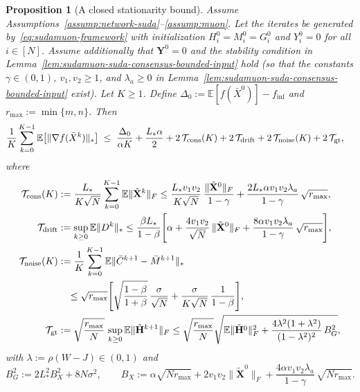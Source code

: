 \documentclass{article}
\newtheorem{proposition}{Proposition}
\begin{document}
\begin{proposition}[A closed stationarity bound]
\label{prop:sudamuon-closed-stationarity}
Assume Assumptions~\ref{assump:network-suda}--\ref{assump:muon}.
Let the iterates be generated by~\eqref{eq:sudamuon-framework} with initialization $H_i^0=M_i^0=G_i^0$ and $Y_i^0=0$ for all $i\in[N]$.
Assume additionally that $\mathbf{Y}^0=0$ and the stability condition in Lemma~\ref{lem:sudamuon-suda-consensus-bounded-input} hold (so that the constants $\gamma\in(0,1)$, $v_1,v_2\ge 1$, and $\lambda_a\ge 0$ in Lemma~\ref{lem:sudamuon-suda-consensus-bounded-input} exist).
Let $K\ge 1$.
Define $\Delta_0:=\mathbb{E}[f(\bar X^0)]-f_{\inf}$ and $r_{\max}:=\min\{m,n\}$.
Then
\begin{equation}
\label{eq:sudamuon-closed-stationarity}
\begin{split}
\frac{1}{K}\sum_{k=0}^{K-1}\mathbb{E}\big[\|\nabla f(\bar X^k)\|_*\big]
\;\le\;&\;
\frac{\Delta_0}{\alpha K}
+\frac{L_*\alpha}{2}
+2\,\mathcal T_{\rm cons}(K)
+2\,\mathcal T_{\rm drift}
+2\,\mathcal T_{\rm noise}(K)
+2\,\mathcal T_{\rm gt},
\end{split}
\end{equation}
where
\begin{align}
\mathcal T_{\rm cons}(K)
&:= \frac{L_*}{K\sqrt N}\sum_{k=0}^{K-1}\mathbb{E}\|\tilde{\mathbf X}^k\|_F
\le \frac{L_*v_1v_2}{K\sqrt N}\,\frac{\|\tilde{\mathbf X}^0\|_F}{1-\gamma}
+ \frac{2L_*\alpha v_1v_2\lambda_a}{1-\gamma}\,\sqrt{r_{\max}},
\label{eq:sudamuon-Tcons}
\\
\mathcal T_{\rm drift}
&:= \sup_{k\ge 0}\mathbb{E}\|D^k\|_*
\le \frac{\beta L_*}{1-\beta}
\Bigg[
\alpha
+\frac{4v_1v_2}{\sqrt N}\,\|\tilde{\mathbf X}^0\|_F
+\frac{8\alpha v_1v_2\lambda_a}{1-\gamma}\,\sqrt{r_{\max}}
\Bigg],
\label{eq:sudamuon-Tdrift}
\\
\mathcal T_{\rm noise}(K)
&:= \frac{1}{K}\sum_{k=0}^{K-1}\mathbb{E}\|\bar C^{k+1}-\bar M^{k+1}\|_*
\notag\\
&\quad\le \sqrt{r_{\max}}\Bigg[
\sqrt{\frac{1-\beta}{1+\beta}}\,\frac{\sigma}{\sqrt N}
+\frac{\sigma}{K\sqrt N}\,\frac{1}{1-\beta}
\Bigg],
\label{eq:sudamuon-Tnoise}
\\
\mathcal T_{\rm gt}
&:= \sqrt{\frac{r_{\max}}{N}}\,\sup_{k\ge 0}\mathbb{E}\|\tilde{\mathbf H}^{k+1}\|_F
\le \sqrt{\frac{r_{\max}}{N}}
\sqrt{\mathbb{E}\|\tilde{\mathbf H}^{0}\|_F^2
+ \frac{4\lambda^2(1+\lambda^2)}{(1-\lambda^2)^2}\,B_G^2},
\label{eq:sudamuon-Tgt}
\end{align}
with $\lambda:=\rho(W-J)\in(0,1)$ and
\begin{equation}
\label{eq:sudamuon-BG-in-prop}
B_G^2:=2L_*^2 B_X^2+8N\sigma^2,
\qquad
B_X:=\alpha\sqrt{Nr_{\max}}+2v_1v_2\|\tilde{\mathbf X}^0\|_F+\frac{4\alpha v_1v_2\lambda_a}{1-\gamma}\,\sqrt{Nr_{\max}}.
\end{equation}
\end{proposition}
\end{document}

